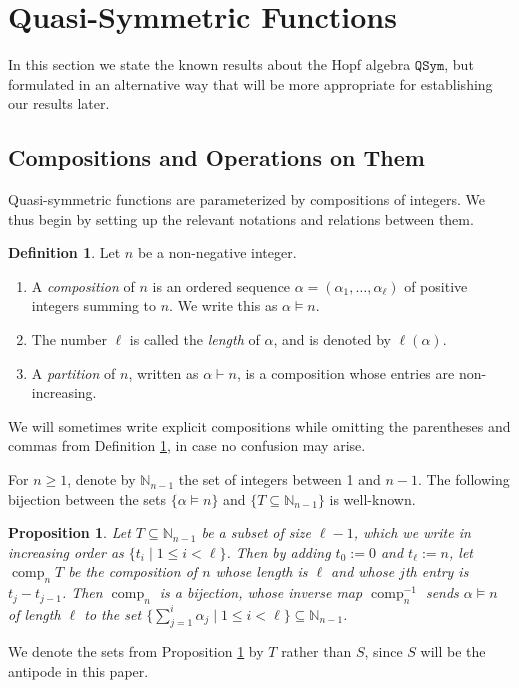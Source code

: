 \documentclass{article}
\newtheorem{prop}[thm]{Proposition}
\theoremstyle{definition}
\newtheorem{defn}[thm]{Definition}
\begin{document}
\section{Quasi-Symmetric Functions \label{QSym}}

In this section we state the known results about the Hopf algebra $\mathtt{QSym}$, but formulated in an alternative way that will be more appropriate for establishing our results later.

\subsection{Compositions and Operations on Them}

Quasi-symmetric functions are parameterized by compositions of integers. We thus begin by setting up the relevant notations and relations between them.

\begin{defn}
Let $n$ be a non-negative integer.
\begin{enumerate}[$(i)$]
\item A \emph{composition} of $n$ is an ordered sequence $\alpha=(\alpha_{1},\ldots,\alpha_{\ell})$ of positive integers summing to $n$. We write this as $\alpha \vDash n$.
\item The number $\ell$ is called the \emph{length} of $\alpha$, and is denoted by $\ell(\alpha)$.
\item A \emph{partition} of $n$, written as $\alpha \vdash n$, is a composition whose entries are non-increasing.
\end{enumerate} \label{defcomp}
\end{defn}
We will sometimes write explicit compositions while omitting the parentheses and commas from Definition \ref{defcomp}, in case no confusion may arise.

For $n\geq1$, denote by $\mathbb{N}_{n-1}$ the set of integers between 1 and $n-1$. The following bijection between the sets $\{\alpha \vDash n\}$ and $\{T\subseteq\mathbb{N}_{n-1}\}$ is well-known.
\begin{prop}
Let $T\subseteq\mathbb{N}_{n-1}$ be a subset of size $\ell-1$, which we write in increasing order as $\{t_{i}\;|\;1 \leq i<\ell\}$. Then by adding $t_{0}:=0$ and $t_{\ell}:=n$, let $\operatorname{comp}_{n}T$ be the composition of $n$ whose length is $\ell$ and whose $j$th entry is $t_{j}-t_{j-1}$. Then $\operatorname{comp}_{n}$ is a bijection, whose inverse map $\operatorname{comp}_{n}^{-1}$ sends $\alpha \vDash n$ of length $\ell$ to the set $\big\{\sum_{j=1}^{i}\alpha_{j}\;|\;1 \leq i<\ell\big\}\subseteq\mathbb{N}_{n-1}$. \label{compn}
\end{prop}
We denote the sets from Proposition \ref{compn} by $T$ rather than $S$, since $S$ will be the antipode in this paper.
\end{document}
